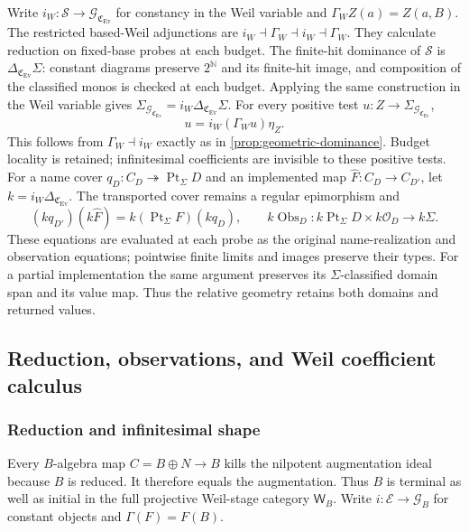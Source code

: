 \documentclass[11pt,a4paper]{article}
\numberwithin{algorithm}{section}
\numberwithin{equation}{section}
\theoremstyle{definition}
\theoremstyle{remark}
\theoremstyle{plain}
\newcommand{\E}{\mathcal E}
\newcommand{\N}{\mathbb N}
\newcommand{\OO}{\mathcal O}
\newcommand{\Pt}{\operatorname{Pt}_{\Sigma}}
\newcommand{\onto}{\twoheadrightarrow}
\newcommand{\Ev}{{\operatorname{Ev}}}
\newcommand{\Weil}{\mathsf W}
\newcommand{\Geo}{\mathcal G_B}
\newcommand{\Cplx}{\mathfrak C_{\Ev}}
\theoremstyle{definition}
\theoremstyle{plain}
\begin{document}
Write $i_W:\mathscr S\to\mathcal G_{\Cplx}$ for constancy
in the Weil variable and $\Gamma_W Z(a)=Z(a,B)$. The restricted
based-Weil adjunctions are
$i_W\dashv\Gamma_W\dashv i_W\dashv\Gamma_W$.
They calculate reduction on fixed-base probes at each budget.
The finite-hit dominance of $\mathscr S$ is $\Delta_{\Cplx}\Sigma$:
constant diagrams preserve $2^{\N}$ and its finite-hit image,
and composition of the classified monos is checked at each
budget. Applying the same construction in the Weil variable
gives $\Sigma_{\mathcal G_{\Cplx}}=i_W\Delta_{\Cplx}\Sigma$.
For every positive test $u:Z\to\Sigma_{\mathcal G_{\Cplx}}$,
\begin{equation}\label{eq:relative-positive-reduction}
 u=i_W(\Gamma_Wu)\eta_Z.
\end{equation}
This follows from $\Gamma_W\dashv i_W$ exactly as in
\cref{prop:geometric-dominance}. Budget locality is retained;
infinitesimal coefficients are invisible to these positive tests.
For a name cover $q_D:C_D\onto\Pt D$ and an implemented map
$\widehat F:C_D\to C_{D'}$, let $k=i_W\Delta_{\Cplx}$.
The transported cover remains a regular epimorphism and
\[
 (kq_{D'})(k\widehat F)=k(\Pt F)(kq_D),\qquad
 k\operatorname{Obs}_D:k\Pt D\times k\OO_D\to k\Sigma.
\]
These equations are evaluated at each probe as the original
name-realization and observation equations; pointwise finite limits
and images preserve their types. For a partial implementation the
same argument preserves its $\Sigma$-classified domain span and
its value map. Thus the relative geometry retains both domains
and returned values.
\subsection{Reduction, observations, and Weil coefficient calculus}
\label{sec:cohesion}
\subsubsection{Reduction and infinitesimal shape}
Every $B$-algebra map $C=B\oplus N\to B$ kills the nilpotent
augmentation ideal because $B$ is reduced.  It therefore equals
the augmentation.  Thus $B$ is terminal as well as initial
in the full projective Weil-stage category $\Weil_B$.
Write $i:\E\to\Geo$ for constant objects and $\Gamma(F)=F(B)$.
\end{document}
